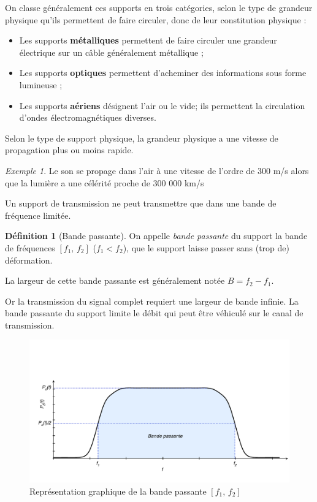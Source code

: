 \documentclass[11pt,english,french]{scrreprt}
\theoremstyle{remark}
\newtheorem*{ex*}{Exemple}
\theoremstyle{definition}
\newtheorem*{def*}{Définition}
\begin{document}
On classe généralement ces supports en trois catégories, selon le type de grandeur physique qu'ils permettent de faire circuler, donc de leur constitution physique :\begin{itemize}
	\item Les supports \textbf{métalliques} permettent de faire circuler une grandeur électrique sur un câble généralement métallique ;
	\item Les supports \textbf{optiques} permettent d'acheminer des informations sous forme lumineuse ;
	\item Les supports \textbf{aériens} désignent l'air ou le vide; ils permettent la circulation d'ondes électromagnétiques diverses.
\end{itemize}

Selon le type de support physique, la grandeur physique a une vitesse de propagation plus ou moins rapide.

\begin{ex*}
	Le son se propage dans l'air à une vitesse de l'ordre de 300 m/s alors que la lumière a une célérité proche de 300 000 km/s
\end{ex*}

Un support de transmission ne peut transmettre que dans une bande de fréquence limitée.

\begin{def*}[Bande passante]
	On appelle \emph{bande passante} du support la bande de fréquences $\left[f_{1},\, f_{2}\right]$ ($f_1<f_2$), que le support laisse passer sans (trop de) déformation.
	
	La largeur de cette bande passante est généralement notée $B=f_2-f_1$.
\end{def*}

Or la transmission du signal complet requiert une largeur de bande infinie. La bande passante du support limite le débit qui peut être véhiculé sur le canal de transmission.

\begin{figure}[h!]
	\center
	\includegraphics[scale=.5]{graphes/bandwidth}
	\caption{Représentation graphique de la bande passante $[f_1,\,f_2]$}
\end{figure}
\end{document}
